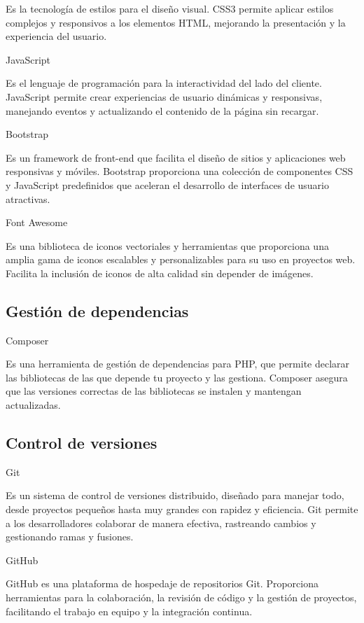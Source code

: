 Es la tecnología de estilos para el diseño visual.
CSS3 permite aplicar estilos complejos y responsivos a los elementos HTML, mejorando la presentación y la experiencia
del usuario.

JavaScript

Es el lenguaje de programación para la interactividad del lado del cliente.
JavaScript permite crear experiencias de usuario dinámicas y responsivas, manejando eventos y actualizando el contenido
de la página sin recargar.

Bootstrap

Es un framework de front-end que facilita el diseño de sitios y aplicaciones web
responsivas y móviles.
Bootstrap proporciona una colección de componentes CSS
y JavaScript predefinidos que aceleran el desarrollo de interfaces de usuario atractivas.

Font Awesome

Es una biblioteca de iconos vectoriales y herramientas que proporciona una amplia gama de
iconos escalables y personalizables para su uso en proyectos web.
Facilita la inclusión de iconos de alta calidad sin depender de imágenes.

\subsection*{Gestión de dependencias}

Composer

Es una herramienta de gestión de dependencias para PHP, que
permite declarar las bibliotecas de las que depende tu proyecto
y las gestiona.
Composer asegura que las versiones correctas de las bibliotecas se instalen y mantengan actualizadas.

\subsection*{Control de versiones}

Git

Es un sistema de control de versiones distribuido, diseñado para manejar todo, desde proyectos
pequeños hasta muy grandes con rapidez y eficiencia.
Git permite a los desarrolladores colaborar de manera efectiva, rastreando cambios y gestionando ramas y fusiones.


GitHub

GitHub es una plataforma de hospedaje de repositorios Git.
Proporciona herramientas para la colaboración, la revisión de código y la gestión de proyectos, facilitando el trabajo
en equipo y la integración continua.


